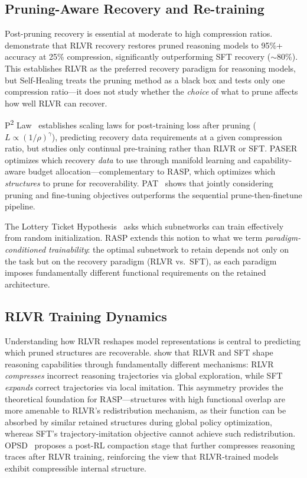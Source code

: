 \subsection{Pruning-Aware Recovery and Re-training}
\label{sec:rw_recovery}

Post-pruning recovery is essential at moderate to high compression ratios.
\citet{selfhealing2025} demonstrate that RLVR recovery restores pruned reasoning models to 95\%+ accuracy at 25\% compression, significantly outperforming SFT recovery (${\sim}$80\%).
This establishes RLVR as the preferred recovery paradigm for reasoning models, but Self-Healing treats the pruning method as a black box and tests only one compression ratio---it does not study whether the \emph{choice} of what to prune affects how well RLVR can recover.

P\textsuperscript{2} Law~\citep{p2law2025} establishes scaling laws for post-training loss after pruning ($L \propto (1/\rho)^\gamma$), predicting recovery data requirements at a given compression ratio, but studies only continual pre-training rather than RLVR or SFT.
PASER~\citep{paser2025} optimizes which recovery \emph{data} to use through manifold learning and capability-aware budget allocation---complementary to RASP, which optimizes which \emph{structures} to prune for recoverability.
PAT~\citep{pat2025} shows that jointly considering pruning and fine-tuning objectives outperforms the sequential prune-then-finetune pipeline.

The Lottery Ticket Hypothesis~\citep{frankle2019lth} asks which subnetworks can train effectively from random initialization.
RASP extends this notion to what we term \emph{paradigm-conditioned trainability}: the optimal subnetwork to retain depends not only on the task but on the recovery paradigm (RLVR vs.\ SFT), as each paradigm imposes fundamentally different functional requirements on the retained architecture.

\subsection{RLVR Training Dynamics}
\label{sec:rw_rlvr}

Understanding how RLVR reshapes model representations is central to predicting which pruned structures are recoverable.
\citet{rlsqueezes2026} show that RLVR and SFT shape reasoning capabilities through fundamentally different mechanisms: RLVR \emph{compresses} incorrect reasoning trajectories via global exploration, while SFT \emph{expands} correct trajectories via local imitation.
This asymmetry provides the theoretical foundation for RASP---structures with high functional overlap are more amenable to RLVR's redistribution mechanism, as their function can be absorbed by similar retained structures during global policy optimization, whereas SFT's trajectory-imitation objective cannot achieve such redistribution.
OPSD~\citep{opsd2026} proposes a post-RL compaction stage that further compresses reasoning traces after RLVR training, reinforcing the view that RLVR-trained models exhibit compressible internal structure.

